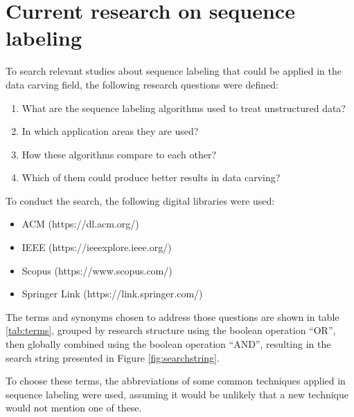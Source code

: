 \section{Current research on sequence labeling}
To search relevant studies about sequence labeling that could be applied in the data carving field, the following research questions were defined:

\begin{enumerate}
\item   What are the sequence labeling algorithms used to treat unstructured data?
\item   In which application areas they are used?
\item   How these algorithms compare to each other?
\item   Which of them could produce better results in data carving?
\end{enumerate}


To conduct the search, the following digital libraries were used: 
\begin{itemize}
\item{ACM} (https://dl.acm.org/)
\item IEEE (https://ieeexplore.ieee.org/)
\item Scopus (https://www.scopus.com/) 
\item Springer Link (https://link.springer.com/)
\end{itemize}

The terms and synonyms chosen to address those questions are shown in table \ref{tab:terms}, grouped by research structure using the boolean operation “OR”, then globally combined using the boolean operation “AND”, resulting in the search string presented in  Figure \ref{fig:searchstring}.

To choose these terms, the abbreviations of some common techniques applied in sequence labeling were used, assuming it would be unlikely that a new technique would not mention one of these.

